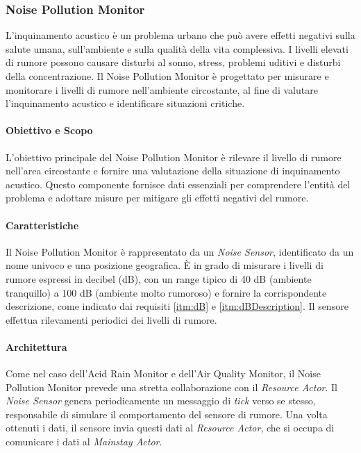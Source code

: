 \documentclass[12pt]{article}
\begin{document}
\subsubsection{Noise Pollution Monitor}
L'inquinamento acustico è un problema urbano che può avere effetti negativi sulla salute umana, sull'ambiente e sulla qualità della vita complessiva. I livelli elevati di rumore possono causare disturbi al sonno, stress, problemi uditivi e disturbi della concentrazione. Il Noise Pollution Monitor è progettato per misurare e monitorare i livelli di rumore nell'ambiente circostante, al fine di valutare l'inquinamento acustico e identificare situazioni critiche.

\paragraph{Obiettivo e Scopo}
L'obiettivo principale del Noise Pollution Monitor è rilevare il livello di rumore nell'area circostante e fornire una valutazione della situazione di inquinamento acustico. Questo componente fornisce dati essenziali per comprendere l'entità del problema e adottare misure per mitigare gli effetti negativi del rumore.

\paragraph{Caratteristiche}
Il Noise Pollution Monitor è rappresentato da un \textit{Noise Sensor}, identificato da un nome univoco e una posizione geografica. È in grado di misurare i livelli di rumore espressi in decibel (dB), con un range tipico di 40 dB (ambiente tranquillo) a 100 dB (ambiente molto rumoroso) e fornire la corrispondente descrizione, come indicato dai requisiti \ref{itm:dB} e \ref{itm:dBDescription}. Il sensore effettua rilevamenti periodici dei livelli di rumore.

\paragraph{Architettura}
Come nel caso dell'Acid Rain Monitor e dell'Air Quality Monitor, il Noise Pollution Monitor prevede una stretta collaborazione con il \textit{Resource Actor}. Il \textit{Noise Sensor} genera periodicamente un messaggio di \textit{tick} verso se stesso, responsabile di simulare il comportamento del sensore di rumore. Una volta ottenuti i dati, il sensore invia questi dati al \textit{Resource Actor}, che si occupa di comunicare i dati al \textit{Mainstay Actor}.
\end{document}

